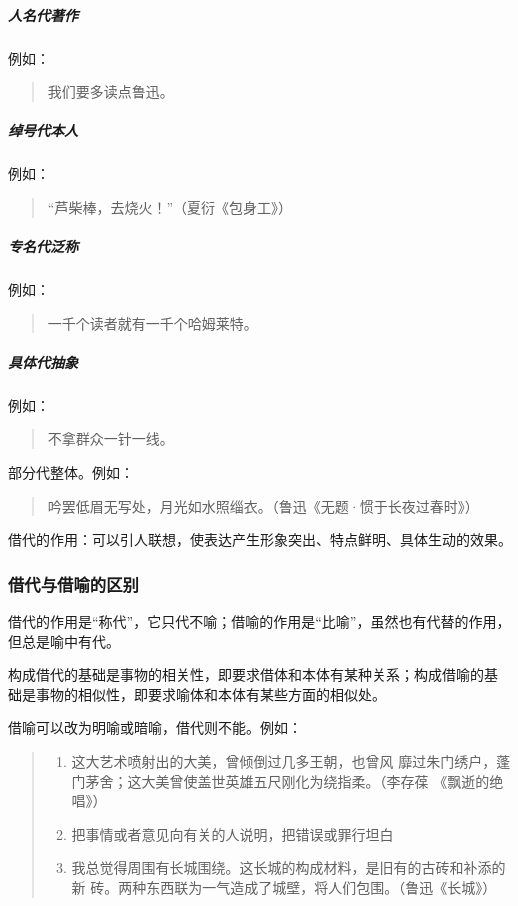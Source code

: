 \documentclass[final,oneside]{ctexbook}
\newenvironment{equotation}{\begin{quotation}\kaishu}{\end{quotation}}
\newenvironment{equote}{\begin{quote}\kaishu}{\end{quote}}
\begin{document}
\subparagraph{人名代著作} 例如：

\begin{equotation}
  我们要多读点鲁迅。
\end{equotation}

\subparagraph{绰号代本人} 例如：

\begin{equotation}
  “芦柴棒，去烧火！”（夏衍《包身工》）
\end{equotation}

\subparagraph{专名代泛称} 例如：

\begin{equotation}
  一千个读者就有一千个哈姆莱特。
\end{equotation}

\subparagraph{具体代抽象} 例如：

\begin{equotation}
  不拿群众一针一线。
\end{equotation}

部分代整体。例如：

\begin{equotation}
  吟罢低眉无写处，月光如水照缁衣。（鲁迅《无题·惯于长夜过春时》）
\end{equotation}

借代的作用：可以引人联想，使表达产生形象突出、特点鲜明、具体生动的效果。

\subsubsection{借代与借喻的区别}

借代的作用是“称代”，它只代不喻；借喻的作用是“比喻”，虽然也有代替的作用，
但总是喻中有代。

构成借代的基础是事物的相关性，即要求借体和本体有某种关系；构成借喻的基
础是事物的相似性，即要求喻体和本体有某些方面的相似处。

借喻可以改为明喻或暗喻，借代则不能。例如：

\begin{equote}
  \begin{enumerate}
    \item \label{item:借代} 这大艺术喷射出的大美，曾倾倒过几多王朝，也曾风
      靡过朱门绣户，蓬门茅舍；这大美曾使盖世英雄五尺刚化为绕指柔。（李存葆
      《飘逝的绝唱》）

    \item \label{item:借喻} 把事情或者意见向有关的人说明，把错误或罪行坦白

    \item 我总觉得周围有长城围绕。这长城的构成材料，是旧有的古砖和补添的新
      砖。两种东西联为一气造成了城壁，将人们包围。（鲁迅《长城》）
  \end{enumerate}
\end{equote}
\end{document}

